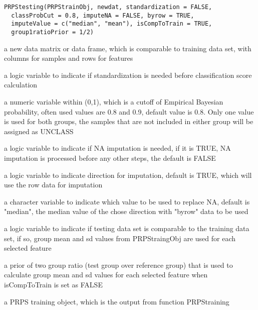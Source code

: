 \documentclass[letterpaper]{book}
\begin{document}
%
\begin{Usage}
\begin{verbatim}
PRPStesting(PRPStrainObj, newdat, standardization = FALSE,
  classProbCut = 0.8, imputeNA = FALSE, byrow = TRUE,
  imputeValue = c("median", "mean"), isCompToTrain = TRUE,
  group1ratioPrior = 1/2)
\end{verbatim}
\end{Usage}
%
\begin{Arguments}
\begin{ldescription}
\item[\code{newdat}] a new data matrix or data frame, which is comparable to training data set, 
with columns for samples and rows for features

\item[\code{standardization}] a logic variable to indicate if standardization is needed before classification 
score calculation

\item[\code{classProbCut}] a numeric variable within (0,1), which is a cutoff of Empirical Bayesian probability, 
often used values are 0.8 and 0.9, default value is 0.8. Only one value is used for both groups, 
the samples that are not included in either group will be assigned as UNCLASS

\item[\code{imputeNA}] a logic variable to indicate if NA imputation is needed, if it is TRUE, NA imputation is 
processed before any other steps, the default is FALSE

\item[\code{byrow}] a logic variable to indicate direction for imputation, default is TRUE, 
which will use the row data for imputation

\item[\code{imputeValue}] a character variable to indicate which value to be used to replace NA, default is "median", 
the median value of the chose direction with "byrow" data to be used

\item[\code{isCompToTrain}] a logic variable to indicate if testing data set is comparable to the training data set, if so, 
group mean and sd values from PRPStraingObj are used for each selected feature

\item[\code{group1ratioPrior}] a prior of two group ratio (test group over reference group) that is used to calculate
group mean and sd values for each selected feature when isCompToTrain is set as FALSE

\item[\code{PStraingObj}] a PRPS training object, which is the output from function PRPStraining
\end{ldescription}
\end{Arguments}
\end{document}

